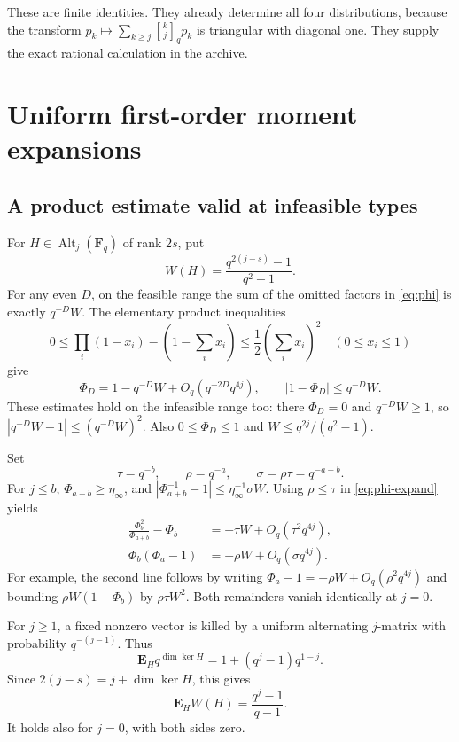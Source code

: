 \documentclass[11pt,letterpaper]{article}
\theoremstyle{remark}
\newcommand{\F}{\mathbf F}
\newcommand{\E}{\mathbf E}
\newcommand{\Alt}{\operatorname{Alt}}
\newcommand{\qb}[2]{\genfrac{[}{]}{0pt}{}{#1}{#2}_{q}}
\begin{document}
These are finite identities. They already determine all four distributions,
because the transform $p_k\mapsto\sum_{k\ge j}\qb kjp_k$ is triangular
with diagonal one. They supply the exact rational calculation in the archive.

\section{Uniform first-order moment expansions}

\subsection{A product estimate valid at infeasible types}

For $H\in\Alt_j(\F_q)$ of rank $2s$, put
\begin{equation}\label{eq:W}
 W(H)=\frac{q^{2(j-s)}-1}{q^2-1}.
\end{equation}
For any even $D$, on the feasible range the sum of the omitted factors in
\eqref{eq:phi} is exactly $q^{-D}W$. The elementary product inequalities
\[
 0\le\prod_i(1-x_i)-\left(1-\sum_i x_i\right)
     \le\frac12\left(\sum_i x_i\right)^2
       \quad(0\le x_i\le1)
\]
give
\begin{equation}\label{eq:phi-expand}
 \Phi_D=1-q^{-D}W+O_q(q^{-2D}q^{4j}),\qquad
 |1-\Phi_D|\le q^{-D}W.
\end{equation}
These estimates hold on the infeasible range too: there $\Phi_D=0$ and
$q^{-D}W\ge1$, so $|q^{-D}W-1|\le(q^{-D}W)^2$.
Also $0\le\Phi_D\le1$ and $W\le q^{2j}/(q^2-1)$.

Set
\[
 \tau=q^{-b},\qquad \rho=q^{-a},\qquad \sigma=\rho\tau=q^{-a-b}.
\]
For $j\le b$, $\Phi_{a+b}\ge\eta_\infty$, and
$|\Phi_{a+b}^{-1}-1|\le\eta_\infty^{-1}\sigma W$.
Using $\rho\le\tau$ in \eqref{eq:phi-expand} yields
\begin{align}
 \frac{\Phi_b^2}{\Phi_{a+b}}-\Phi_b
     &=-\tau W+O_q(\tau^2q^{4j}),\label{eq:prod-rank}\\
 \Phi_b(\Phi_a-1)
     &=-\rho W+O_q(\sigma q^{4j}).\label{eq:prod-defect}
\end{align}
For example, the second line follows by writing
$\Phi_a-1=-\rho W+O_q(\rho^2q^{4j})$ and bounding
$\rho W(1-\Phi_b)$ by $\rho\tau W^2$.
Both remainders vanish identically at $j=0$.

For $j\ge1$, a fixed nonzero vector is killed by a uniform alternating
$j$-matrix with probability $q^{-(j-1)}$. Thus
\[
 \E_Hq^{\dim\ker H}=1+(q^j-1)q^{1-j}.
\]
Since $2(j-s)=j+\dim\ker H$, this gives
\begin{equation}\label{eq:EW}
 \E_HW(H)=\frac{q^j-1}{q-1}.
\end{equation}
It holds also for $j=0$, with both sides zero.
\end{document}

